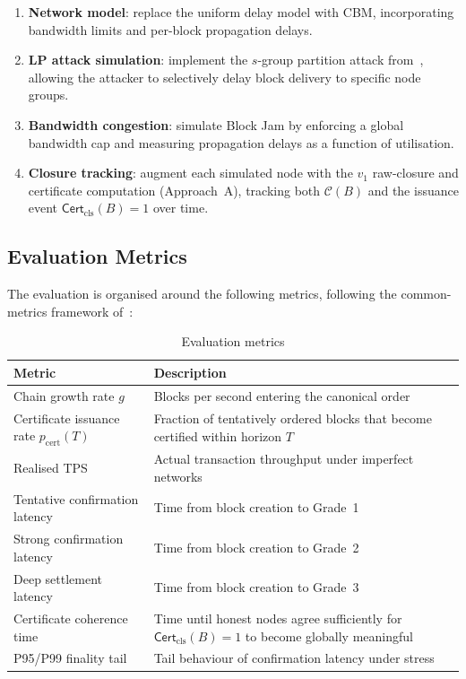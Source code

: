 \documentclass[11pt]{article}
\theoremstyle{definition}
\theoremstyle{plain}
\theoremstyle{remark}
\newcommand{\Clvl}{\mathcal{C}}          %
\newcommand{\Certcls}{\mathsf{Cert}_{\mathrm{cls}}}
\begin{document}
\begin{enumerate}[nosep]
    \item \textbf{Network model}: replace the uniform delay model with CBM,
    incorporating bandwidth limits and per-block propagation delays.
    \item \textbf{LP attack simulation}: implement the $s$-group partition
    attack from~\cite{wu2024security}, allowing the attacker to selectively
    delay block delivery to specific node groups.
    \item \textbf{Bandwidth congestion}: simulate Block Jam by enforcing a
    global bandwidth cap and measuring propagation delays as a function of
    utilisation.
    \item \textbf{Closure tracking}: augment each simulated node with the
    $v_1$ raw-closure and certificate computation (Approach~A), tracking both
    $\Clvl(B)$ and the issuance event $\Certcls(B)=1$ over time.
\end{enumerate}

\subsection{Evaluation Metrics}

The evaluation is organised around the following metrics, following the common-metrics
framework of~\cite{zhang2019common}:

\begin{table}[tbp]
\centering
\caption{Evaluation metrics}
\label{tab:metrics}
\small
\renewcommand{\arraystretch}{1.1}
\begin{tabularx}{0.94\textwidth}{@{}L{4.1cm}Y@{}}
\toprule
\textbf{Metric} & \textbf{Description} \\
\midrule
Chain growth rate $g$
    & Blocks per second entering the canonical order \\
Certificate issuance rate $p_{\mathrm{cert}}(T)$
    & Fraction of tentatively ordered blocks that become certified within horizon $T$ \\
Realised TPS
    & Actual transaction throughput under imperfect networks \\
Tentative confirmation latency
    & Time from block creation to Grade~1 \\
Strong confirmation latency
    & Time from block creation to Grade~2 \\
Deep settlement latency
    & Time from block creation to Grade~3 \\
Certificate coherence time
    & Time until honest nodes agree sufficiently for $\Certcls(B)=1$ to become globally meaningful \\
P95/P99 finality tail
    & Tail behaviour of confirmation latency under stress \\
\bottomrule
\end{tabularx}
\end{table}
\end{document}
